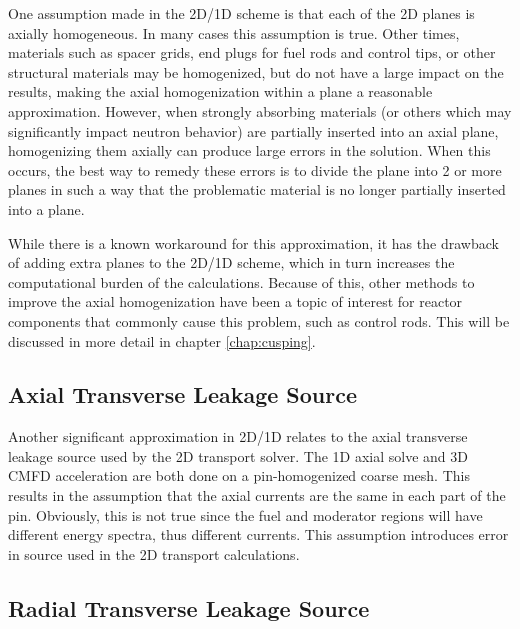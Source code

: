 One assumption made in the 2D/1D scheme is that each of the 2D planes is axially homogeneous.  In many cases this assumption is true.  Other times, materials such as spacer grids, end plugs for fuel rods and control tips, or other structural materials may be homogenized, but do not have a large impact on the results, making the axial homogenization within a plane a reasonable approximation.  However, when strongly absorbing materials (or others which may significantly impact neutron behavior) are partially inserted into an axial plane, homogenizing them axially can produce large errors in the solution.  When this occurs, the best way to remedy these errors is to divide the plane into 2 or more planes in such a way that the problematic material is no longer partially inserted into a plane.

While there is a known workaround for this approximation, it has the drawback of adding extra planes to the 2D/1D scheme, which in turn increases the computational burden of the calculations.  Because of this, other methods to improve the axial homogenization have been a topic of interest for reactor components that commonly cause this problem, such as control rods.  This will be discussed in more detail in chapter \ref{chap:cusping}.

\subsection{Axial Transverse Leakage Source}

Another significant approximation in 2D/1D relates to the axial transverse leakage source used by the 2D transport solver.  The 1D axial solve and 3D CMFD acceleration are both done on a pin-homogenized coarse mesh.  This results in the assumption that the axial currents are the same in each part of the pin.  Obviously, this is not true since the fuel and moderator regions will have different energy spectra, thus different currents.  This assumption introduces error in source used in the 2D transport calculations.

\subsection{Radial Transverse Leakage Source}
